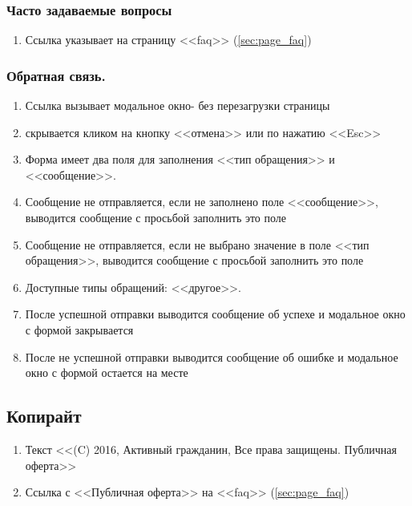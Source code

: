             \subsubsection{Часто задаваемые вопросы}
                \begin{enumerate}
                    \item Ссылка указывает на страницу <<faq>> (\ref{sec:page_faq})
                \end{enumerate}
            \subsubsection{Обратная связь.}
                \begin{enumerate}
                    \item Ссылка вызывает модальное окно- без перезагрузки страницы
                    \item {} скрывается кликом на кнопку <<отмена>> или по нажатию <<Esc>>
                    \item Форма имеет два поля для заполнения <<тип обращения>> и <<сообщение>>.
                    \item Сообщение не отправляется, если не заполнено поле <<сообщение>>, выводится сообщение с просьбой заполнить это поле
                    \item Сообщение не отправляется, если не выбрано значение в поле <<тип обращения>>, выводится сообщение с просьбой заполнить это поле
                    \item Доступные типы обращений: <<другое>>.
                    \item После успешной отправки выводится сообщение об успехе и модальное окно с формой закрывается
                    \item После не успешной отправки выводится сообщение об ошибке и модальное окно с формой остается на месте
                \end{enumerate}

        \subsection{Копирайт}
            \label{sec:baseitems_footer_copiright}
            \begin{enumerate}
                \item Текст <<(C) 2016, Активный гражданин, Все права защищены. Публичная оферта>>
                \item Ссылка с <<Публичная оферта>> на <<faq>> (\ref{sec:page_faq})
            \end{enumerate}
